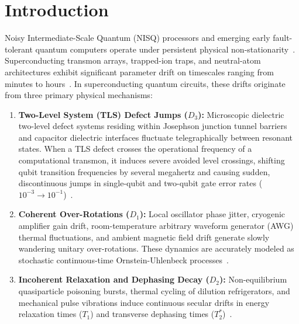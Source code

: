 \documentclass[aps,pra,twocolumn,superscriptaddress,10pt,floatfix]{revtex4-2}
\begin{document}
\maketitle

\section{Introduction}
\label{sec:intro}
Noisy Intermediate-Scale Quantum (NISQ) processors and emerging early fault-tolerant quantum computers operate under persistent physical non-stationarity~\cite{nielsen2010quantum,preskill2018quantum,bharti2022noisy}. Superconducting transmon arrays, trapped-ion traps, and neutral-atom architectures exhibit significant parameter drift on timescales ranging from minutes to hours~\cite{proctor2020detecting,klimov2018fluctuations,burnett2019decoherence}. In superconducting quantum circuits, these drifts originate from three primary physical mechanisms:
\begin{enumerate}
    \item \textbf{Two-Level System (TLS) Defect Jumps ($D_3$):} Microscopic dielectric two-level defect systems residing within Josephson junction tunnel barriers and capacitor dielectric interfaces fluctuate telegraphically between resonant states. When a TLS defect crosses the operational frequency of a computational transmon, it induces severe avoided level crossings, shifting qubit transition frequencies by several megahertz and causing sudden, discontinuous jumps in single-qubit and two-qubit gate error rates ($10^{-3} \to 10^{-1}$)~\cite{muller2019towards,klimov2018fluctuations,place2021new,barends2013coherent}.
    \item \textbf{Coherent Over-Rotations ($D_1$):} Local oscillator phase jitter, cryogenic amplifier gain drift, room-temperature arbitrary waveform generator (AWG) thermal fluctuations, and ambient magnetic field drift generate slowly wandering unitary over-rotations. These dynamics are accurately modeled as stochastic continuous-time Ornstein-Uhlenbeck processes~\cite{bluhm2011dephasing,koch2007charge}.
    \item \textbf{Incoherent Relaxation and Dephasing Decay ($D_2$):} Non-equilibrium quasiparticle poisoning bursts, thermal cycling of dilution refrigerators, and mechanical pulse vibrations induce continuous secular drifts in energy relaxation times ($T_1$) and transverse dephasing times ($T_2^*$)~\cite{burnett2019decoherence}.
\end{enumerate}
\end{document}
